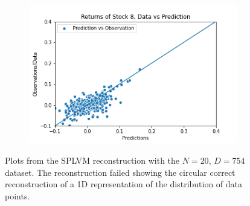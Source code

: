 \begin{figure}
	\begin{subfigure}[r]{0.3\textwidth}
		\includegraphics[width=\textwidth]{img/07_1/N20/Q1_kernel1_stock8_scatter.png}
	\end{subfigure}
	\caption[Y-$\hat{Y}$ pair plots for N=20 with the SPLVM model]{Plots from the SPLVM reconstruction with the $N=20$, $D=754$ dataset. The reconstruction failed showing the circular correct reconstruction of a 1D representation of the distribution of data points.}
	\label{fig:studt_N20_pairs}
\end{figure}
